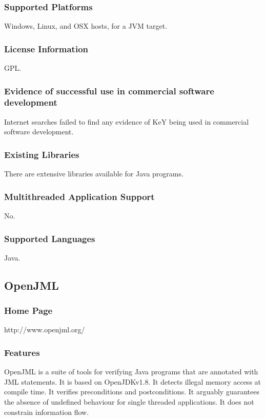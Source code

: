 \documentclass[11pt]{article}
\begin{document}
	\subsubsection{Supported Platforms} 
		Windows, Linux, and OSX hosts, for a JVM target.
	\subsubsection{License Information} 
		GPL.		
	\subsubsection{Evidence of successful use in commercial software development} 
		Internet searches failed to find any evidence of KeY being used in commercial software development. 
	\subsubsection{Existing Libraries} 
		There are extensive libraries available for Java programs.
	\subsubsection{Multithreaded Application Support} 
		No.
	\subsubsection{Supported Languages} 
		Java.	










\subsection{OpenJML}
	\subsubsection{Home Page}%
	http://www.openjml.org/
	\subsubsection{Features}
	OpenJML is a suite of tools for verifying Java programs that are annotated with JML statements. It is based on OpenJDKv1.8. It detects illegal memory access at compile time. It verifies preconditions and postconditions. It arguably guarantees the absence of undefined behaviour for single threaded applications. It does not constrain information flow.
	
\end{document}
